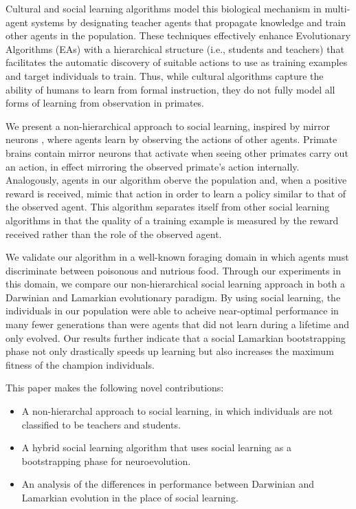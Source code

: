 \documentclass{acm_proc_article-sp}
\begin{document}
Cultural and social learning algorithms \cite{reynolds1994introduction} model this biological mechanism in multi-agent systems by designating teacher agents that propagate knowledge and train other agents in the population. These techniques effectively enhance Evolutionary Algorithms (EAs) with a hierarchical structure (i.e., students and teachers) that facilitates the automatic discovery of suitable actions to use as training examples and target individuals to train. Thus, while cultural algorithms capture the ability of humans to learn from formal instruction, they do not fully model all forms of learning from observation in primates.

We present a non-hierarchical approach to social learning, inspired by mirror neurons \cite{gallese-98}, where agents learn by observing the actions of other agents. Primate brains contain mirror neurons that activate when seeing other primates carry out an action, in effect mirroring the observed primate's action internally. Analogously, agents in our algorithm oberve the population and, when a positive reward is received, mimic that action in order to learn a policy similar to that of the observed agent. This algorithm separates itself from other social learning algorithms in that the quality of a training example is measured by the reward received rather than the role of the observed agent.

We validate our algorithm in a well-known foraging domain in which agents must discriminate between poisonous and nutrious food. Through our experiments in this domain, we compare our non-hierarchical social learning approach in both a Darwinian and Lamarkian evolutionary paradigm. By using social learning, the individuals in our population were able to acheive near-optimal performance in many fewer generations than were agents that did not learn during a lifetime and only evolved. Our results further indicate that a social Lamarkian bootstrapping phase not only drastically speeds up learning but also increases the maximum fitness of the champion individuals.

This paper makes the following novel contributions:
 
\begin{itemize}
\item A non-hierarchal approach to social learning, in which individuals are not classified to be teachers and students.
\item A hybrid social learning algorithm that uses social learning as a bootstrapping phase for neuroevolution.
\item An analysis of the differences in performance between Darwinian and Lamarkian evolution in the place of social learning.
\end{itemize}
 
\end{document}
